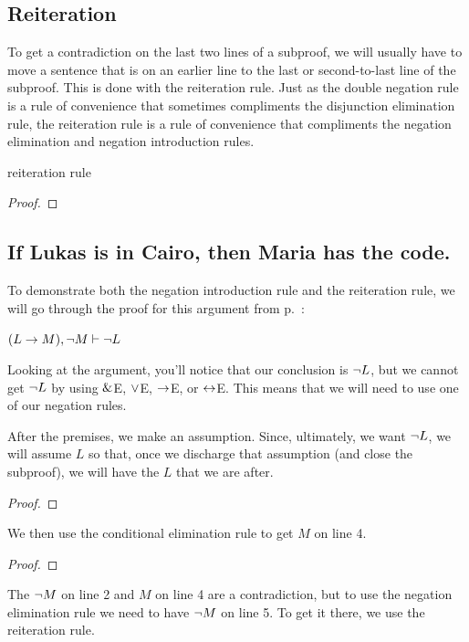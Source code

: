 {{{{{{{{{%

\subsection{Reiteration}

To get a contradiction on the last two lines of a subproof, we will usually have to move a sentence that is on an earlier line to the last or second-to-last line of the subproof. This is done with the {reiteration rule}. Just as the double negation rule is a rule of convenience that sometimes compliments the disjunction elimination rule, the reiteration rule is a rule of convenience that compliments the negation elimination and negation introduction rules.  

\begin{factboxy-width}[width=7.5cm]{reiteration rule}
\begin{proof}
	 
\end{proof}
\end{factboxy-width}

\subsection{If Lukas is in Cairo, then Maria has the code.}

To demonstrate both the negation introduction rule and the reiteration rule, we will go through the proof for this argument from p.~\pageref{Cairo}: 

\centerline{$(L \rightarrow M), {\neg} M \vdash {\neg} L$} 

\noindent Looking at the argument, you'll notice that our conclusion is ${\neg} L$, but we cannot get ${\neg} L$ by using $\mathbin{\&}$E, $\vee$E, $\rightarrow$E, or $\leftrightarrow$E. This means that we will need to use one of our negation rules.

After the premises, we make an assumption. Since, ultimately, we want ${\neg} L$, we will assume $L$ so that, once we discharge that assumption (and close the subproof), we will have the $L$ that we are after.

\begin{proof}
	 \pr{}	
	 \pr{}
	\open
		\as{}
\end{proof}
We then use the conditional elimination rule to get $M$ on line 4. 
\begin{proof}
	 \pr{}	
	 \pr{}
	\open
		\as{}
\end{proof}
The ${\neg} M$ on line 2 and $M$ on line 4 are a contradiction, but to use the negation elimination rule we need to have ${\neg} M$ on line 5. To get it there, we use the reiteration rule. 

}}}}}}}}}

